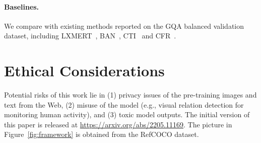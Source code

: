 \documentclass[11pt]{article}
\begin{document}
\paragraph{Baselines.} We compare with existing methods reported on the GQA balanced validation dataset, including LXMERT~\cite{tan2019lxmert}, BAN~\cite{kim2018bilinear}, CTI~\cite{do2019compact} and CFR~\cite{nguyen2021coarse}.


\section{Ethical Considerations}
Potential risks of this work lie in (1) privacy issues of the pre-training images and text from the Web, (2) misuse of the model (e.g., visual relation detection for monitoring human activity), and (3) toxic model outputs. The initial version of this paper is released at \url{https://arxiv.org/abs/2205.11169}. The picture in Figure~\ref{fig:framework} is obtained from the RefCOCO dataset.
\end{document}

